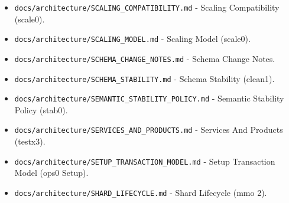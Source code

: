 \documentclass[9pt,a4paper,openany]{book}
\begin{document}
\begin{itemize}
\item \texttt{docs/\allowbreak{}architecture/\allowbreak{}SCALING\_\allowbreak{}COMPATIBILITY.\allowbreak{}md} -\allowbreak{} Scaling Compatibility (scale0).\allowbreak{}
\end{itemize}

\begin{itemize}
\item \texttt{docs/\allowbreak{}architecture/\allowbreak{}SCALING\_\allowbreak{}MODEL.\allowbreak{}md} -\allowbreak{} Scaling Model (scale0).\allowbreak{}
\end{itemize}

\begin{itemize}
\item \texttt{docs/\allowbreak{}architecture/\allowbreak{}SCHEMA\_\allowbreak{}CHANGE\_\allowbreak{}NOTES.\allowbreak{}md} -\allowbreak{} Schema Change Notes.\allowbreak{}
\end{itemize}

\begin{itemize}
\item \texttt{docs/\allowbreak{}architecture/\allowbreak{}SCHEMA\_\allowbreak{}STABILITY.\allowbreak{}md} -\allowbreak{} Schema Stability (clean1).\allowbreak{}
\end{itemize}

\begin{itemize}
\item \texttt{docs/\allowbreak{}architecture/\allowbreak{}SEMANTIC\_\allowbreak{}STABILITY\_\allowbreak{}POLICY.\allowbreak{}md} -\allowbreak{} Semantic Stability Policy (stab0).\allowbreak{}
\end{itemize}

\begin{itemize}
\item \texttt{docs/\allowbreak{}architecture/\allowbreak{}SERVICES\_\allowbreak{}AND\_\allowbreak{}PRODUCTS.\allowbreak{}md} -\allowbreak{} Services And Products (testx3).\allowbreak{}
\end{itemize}

\begin{itemize}
\item \texttt{docs/\allowbreak{}architecture/\allowbreak{}SETUP\_\allowbreak{}TRANSACTION\_\allowbreak{}MODEL.\allowbreak{}md} -\allowbreak{} Setup Transaction Model (ops0 Setup).\allowbreak{}
\end{itemize}

\begin{itemize}
\item \texttt{docs/\allowbreak{}architecture/\allowbreak{}SHARD\_\allowbreak{}LIFECYCLE.\allowbreak{}md} -\allowbreak{} Shard Lifecycle (mmo 2).\allowbreak{}
\end{itemize}
\end{document}
